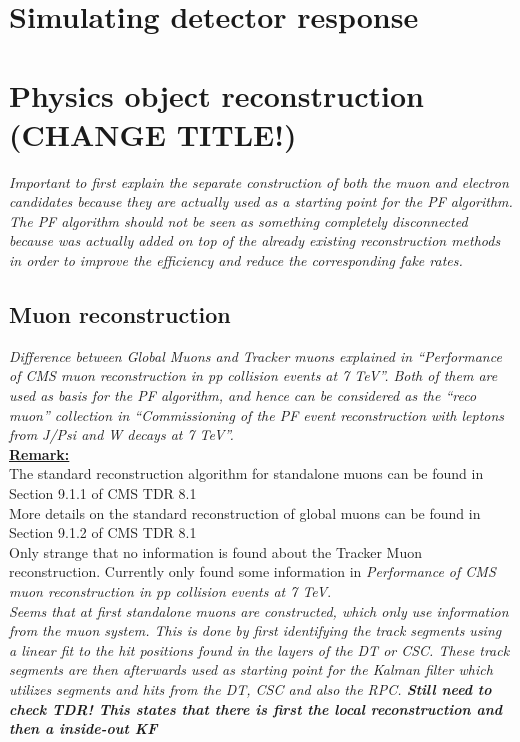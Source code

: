 \section{Simulating detector response} \label{sec::DetectorSim} %

\section{Physics object reconstruction (CHANGE TITLE!)} \label{sec::PhysicsObjects}

\textit{Important to first explain the separate construction of both the muon and electron candidates because they are actually used as a starting point for the PF algorithm. The PF algorithm should not be seen as something completely disconnected because was actually added on top of the already existing reconstruction methods in order to improve the efficiency and reduce the corresponding fake rates.}

\subsection{Muon reconstruction}\label{subsec::Muon}

\textit{Difference between Global Muons and Tracker muons explained in ``Performance of CMS muon reconstruction in pp collision events at 7 TeV''. Both of them are used as basis for the PF algorithm, and hence can be considered as the ``reco muon'' collection in ``Commissioning of the PF event reconstruction with leptons from J/Psi and W decays at 7 TeV''.}
\\

\textbf{\underline{Remark:}}\\
The standard reconstruction algorithm for standalone muons can be found in Section 9.1.1 of CMS TDR 8.1\\
More details on the standard reconstruction of global muons can be found in Section 9.1.2 of CMS TDR 8.1\\
Only strange that no information is found about the Tracker Muon reconstruction. Currently only found some information in \textit{Performance of CMS muon reconstruction in pp collision events at 7 TeV}.\\

\textit{Seems that at first standalone muons are constructed, which only use information from the muon system. This is done by first identifying the track segments using a linear fit to the hit positions found in the layers of the DT or CSC. These track segments are then afterwards used as starting point for the Kalman filter which utilizes segments and hits from the DT, CSC and also the RPC. \textbf{Still need to check TDR! This states that there is first the local reconstruction and then a inside-out KF}}

